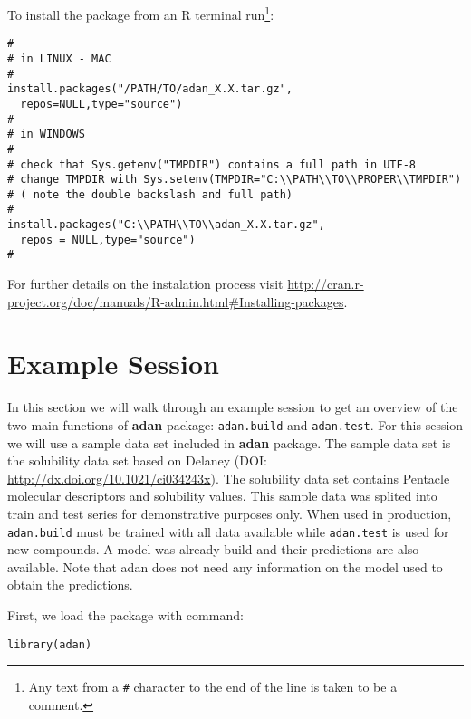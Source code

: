 \documentclass[a4paper]{article}
\begin{document}
To install the package from an R terminal run\footnote{Any text from a \texttt{\#} character to the end of the line is taken to be a comment.}:

\begin{verbatim}
#  
# in LINUX - MAC 
#
install.packages("/PATH/TO/adan_X.X.tar.gz",
  repos=NULL,type="source")
#
# in WINDOWS  
# 
# check that Sys.getenv("TMPDIR") contains a full path in UTF-8
# change TMPDIR with Sys.setenv(TMPDIR="C:\\PATH\\TO\\PROPER\\TMPDIR")
# ( note the double backslash and full path)
#
install.packages("C:\\PATH\\TO\\adan_X.X.tar.gz", 
  repos = NULL,type="source")
#
\end{verbatim}

For further details on the instalation process visit \url{http://cran.r-project.org/doc/manuals/R-admin.html#Installing-packages}.





\section{Example Session}
In this section we will walk through an example session to get an 
overview of the two main functions of \textbf{adan} package: \texttt{adan.build} and \texttt{adan.test}. For this session we will use a sample data set included in \textbf{adan} package. The sample data set is the solubility data set  based on Delaney (DOI: \url{http://dx.doi.org/10.1021/ci034243x}).
The solubility data set contains Pentacle molecular descriptors and solubility values. This sample data was splited into train and test series for demonstrative purposes only. When used in production, \texttt{adan.build} must be trained with all data available while \texttt{adan.test} is used for new compounds. A model was already build and their predictions are also available. Note that adan does not need any information on the model used to obtain the predictions.

First, we load the package with command:
\begin{verbatim}
library(adan)
\end{verbatim}
\end{document}
